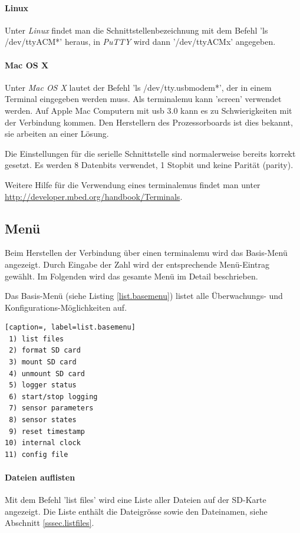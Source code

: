 \paragraph{Linux} Unter \emph{Linux} findet man die Schnittstellenbezeichnung mit dem Befehl 'ls /dev/ttyACM*' heraus, in \emph{PuTTY} wird dann '/dev/ttyACMx' angegeben. 

\paragraph{Mac OS X} Unter \emph{Mac OS X} lautet der Befehl 'ls /dev/tty.usbmodem*', der in einem Terminal eingegeben werden muss. Als \gls{terminalemu} kann 'screen' verwendet werden. Auf Apple Mac Computern mit \gls{usb} 3.0 kann es zu Schwierigkeiten mit der Verbindung kommen. Den Herstellern des Prozessorboards ist dies bekannt, sie arbeiten an einer Lösung.

Die Einstellungen für die serielle Schnittstelle sind normalerweise bereits korrekt gesetzt. Es werden 8 Datenbits verwendet, 1 Stopbit und keine Parität (parity).

Weitere Hilfe für die Verwendung eines \gls{terminalemu}s findet man unter \url{http://developer.mbed.org/handbook/Terminals}.



\subsection{Menü}\label{ssec.menu}
Beim Herstellen der Verbindung über einen \gls{terminalemu} wird das Basis-Menü angezeigt. Durch Eingabe der Zahl wird der entsprechende Menü-Eintrag gewählt. Im Folgenden wird das gesamte Menü im Detail beschrieben.

Das Basis-Menü (siehe Listing \ref{list.basemenu}) listet alle Überwachungs- und Konfigurations-Möglichkeiten auf. 

\begin{lstlisting}[caption=, label=list.basemenu]
 1) list files
 2) format SD card
 3) mount SD card
 4) unmount SD card
 5) logger status
 6) start/stop logging
 7) sensor parameters
 8) sensor states
 9) reset timestamp
10) internal clock
11) config file
\end{lstlisting}

\paragraph{Dateien auflisten} Mit dem Befehl 'list files' wird eine Liste aller Dateien auf der SD-Karte angezeigt. Die Liste enthält die Dateigrösse sowie den Dateinamen, siehe Abschnitt \ref{sssec.listfiles}.


